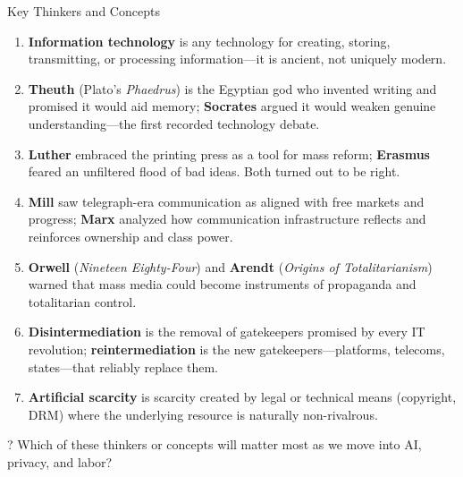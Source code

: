 \documentclass[aspectratio=169]{beamer}
\begin{document}
\begin{frame}[allowframebreaks]{Key Thinkers and Concepts}
\footnotesize
\begin{enumerate}
    \item \textbf{Information technology} is any technology for creating, storing, transmitting, or processing information---it is ancient, not uniquely modern.
    \item \textbf{Theuth} (Plato's \textit{Phaedrus}) is the Egyptian god who invented writing and promised it would aid memory; \textbf{Socrates} argued it would weaken genuine understanding---the first recorded technology debate.
    \item \textbf{Luther} embraced the printing press as a tool for mass reform; \textbf{Erasmus} feared an unfiltered flood of bad ideas. Both turned out to be right.
    \item \textbf{Mill} saw telegraph-era communication as aligned with free markets and progress; \textbf{Marx} analyzed how communication infrastructure reflects and reinforces ownership and class power.
    \item \textbf{Orwell} (\textit{Nineteen Eighty-Four}) and \textbf{Arendt} (\textit{Origins of Totalitarianism}) warned that mass media could become instruments of propaganda and totalitarian control.
    \item \textbf{Disintermediation} is the removal of gatekeepers promised by every IT revolution; \textbf{reintermediation} is the new gatekeepers---platforms, telecoms, states---that reliably replace them.
    \item \textbf{Artificial scarcity} is scarcity created by legal or technical means (copyright, DRM) where the underlying resource is naturally non-rivalrous.
\end{enumerate}

\begin{alertblock}{?}
Which of these thinkers or concepts will matter most as we move into AI, privacy, and labor?
\end{alertblock}
\end{frame}
\end{document}
